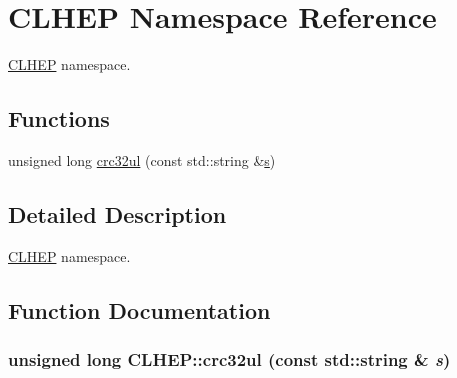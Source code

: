\hypertarget{namespace_c_l_h_e_p}{
\section{CLHEP Namespace Reference}
\label{namespace_c_l_h_e_p}
}


\hyperlink{namespace_c_l_h_e_p}{CLHEP} namespace.  
\subsection*{Functions}
\begin{DoxyCompactItemize}
\item 
unsigned long \hyperlink{namespace_c_l_h_e_p_a5222e5dfca56b9684ab59bea27e89405}{crc32ul} (const std::string \&\hyperlink{_volumes_8cpp_a17ca6bfc8040d695d3cada22a4763d40}{s})
\end{DoxyCompactItemize}


\subsection{Detailed Description}
\hyperlink{namespace_c_l_h_e_p}{CLHEP} namespace. 

\subsection{Function Documentation}
\hypertarget{namespace_c_l_h_e_p_a5222e5dfca56b9684ab59bea27e89405}{
\subsubsection[{crc32ul}]{\setlength{\rightskip}{0pt plus 5cm}unsigned long CLHEP::crc32ul (const std::string \& {\em s})}}
\label{namespace_c_l_h_e_p_a5222e5dfca56b9684ab59bea27e89405}
